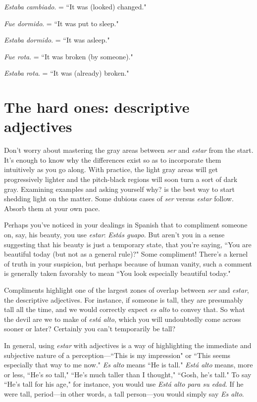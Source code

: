 \indu \emph{Estaba cambiado}. = ``It was (looked) changed." 

\indu \emph{Fue dormido}. = ``It was put to sleep."

\indu \emph{Estaba dormido}. = ``It was asleep."

\indu \emph{Fue rota}. = ``It was broken (by someone)."

\indu \emph{Estaba rota}. = ``It was (already) broken."

\section{The hard ones: descriptive adjectives}

Don't worry about mastering the gray areas between \emph{ser} and
\emph{estar} from the start. It's enough to know why the differences exist so
as to incorporate them intuitively as you go along. With practice, the
light gray areas will get progressively lighter and the pitch-black regions will soon turn a sort of dark gray. Examining examples and asking yourself why? is the best way to start shedding light on the matter.
Some dubious cases of \emph{ser} versus \emph{estar} follow. Absorb them at your
own pace.

Perhaps you've noticed in your dealings in Spanish that to compliment someone on, say, his beauty, you use \emph{estar}: \emph{Estás guapo}. But
aren't you in a sense suggesting that his beauty is just a temporary
state, that you're saying, ``You are beautiful today (but not as a general
rule)?" Some compliment! There's a kernel of truth in your suspicion,
but perhaps because of human vanity, such a comment is generally
taken favorably to mean ``You look especially beautiful today."

Compliments highlight one of the largest zones of overlap between \emph{ser} and \emph{estar}, the descriptive adjectives. For instance, if someone is tall, they are presumably tall all the time, and we would correctly expect \emph{es alto} to convey that. So what the devil are we to make
of \emph{está alto}, which you will undoubtedly come across sooner or later?
Certainly you can't temporarily be tall?

In general, using \emph{estar} with adjectives is a way of highlighting
the immediate and subjective nature of a perception---``This is my
impression" or ``This seems especially that way to me now." \emph{Es alto}
means ``He is tall." \emph{Está alto} means, more or less, ``He's so tall," ``He's
much taller than I thought," ``Gosh, he's tall." To say ``He's tall for his
age," for instance, you would use \emph{Está alto para su edad}. If he were
tall, period---in other words, a tall person---you would simply say
\emph{Es alto}.

